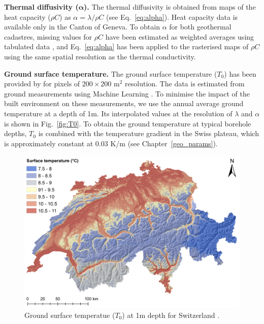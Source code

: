 \textbf{Thermal diffusivity ($\mathbf{\alpha}$).}
The thermal diffusivity is obtained from maps of the heat capacity ($\rho C$) as $\alpha = \lambda / \rho C$ (see Eq.~\ref{eq:alpha}). 
Heat capacity data is available only in the Canton of Geneva.
To obtain $\alpha$ for both geothermal cadastres, missing values for $\rho C$ have been estimated as weighted averages using
tabulated data \cite{groupe_de_travail_pgg_evaluation_2011-1, sia_sondes_2010}, and Eq.~\ref{eq:alpha} has been applied to the rasterised maps of $\rho C$ using the same spatial resolution as the thermal conductivity.


\textbf{Ground surface temperature.}
The ground surface temperature ($T_0$) has been provided by \citet{assouline_machine_2019} for pixels of $200 \times 200$ m$^2$ resolution.
The data is estimated from ground measurements using Machine Learning \cite{assouline_machine_2019}.
To minimise the impact of the built environment on these measurements, we use the annual average ground temperature at a depth of 1m.
Its interpolated values at the resolution of $\lambda$ and $\alpha$ is shown in Fig.~\ref{fig:T0}.
To obtain the ground temperature at typical borehole depths, $T_0$ is combined with the temperature gradient in the Swiss plateau, which is approximately constant at 0.03 K/m \cite{sia_sondes_2010} (see Chapter~\ref{geo_params}).

\begin{figure}[tb]
\centering
  \includegraphics[width=.7\linewidth]{images/Figs/T_surface_CH.png}  
\caption{Ground surface temperatue ($T_0$) at 1m depth for Switzerland \cite{assouline_machine_2019}.}
\label{fig:T0_CH}
\end{figure}


